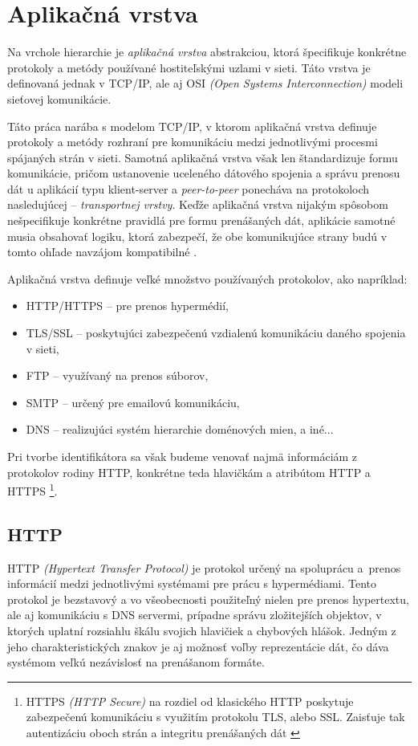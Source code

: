 \documentclass[
  printed, %
  table,   %
  lof,     %
  nolot,   %
  nocover
]{fithesis3}
\begin{document}
\section{Aplikačná vrstva}
Na vrchole hierarchie je \textit{aplikačná vrstva} abstrakciou, ktorá špecifikuje
konkrétne protokoly a metódy používané hostiteľskými uzlami v sieti. Táto
vrstva je definovaná jednak v TCP/IP, ale aj OSI
\textit{(Open Systems Interconnection)} modeli sieťovej komunikácie.

Táto práca narába s modelom TCP/IP, v ktorom aplikačná vrstva definuje
protokoly a metódy rozhraní pre komunikáciu medzi jednotlivými procesmi
spájaných strán v sieti. Samotná aplikačná vrstva však len štandardizuje formu
komunikácie, pričom ustanovenie uceleného dátového spojenia a správu prenosu dát
u aplikácií typu klient-server a \textit{peer-to-peer} ponecháva na protokoloch
nasledujúcej -- \textit{transportnej vrstvy}. Keďže aplikačná vrstva nijakým spôsobom
nešpecifikuje konkrétne pravidlá pre formu prenášaných dát,
aplikácie samotné musia obsahovať logiku, ktorá zabezpečí, že obe komunikujúce
strany budú v tomto ohľade navzájom kompatibilné \cite{rfc1123}.

Aplikačná vrstva definuje veľké množstvo používaných protokolov, ako napríklad:
\begin{itemize}
	\item HTTP/HTTPS -- pre prenos hypermédií, 
	\item TLS/SSL -- poskytujúci zabezpečenú vzdialenú komunikáciu daného spojenia v sieti,
	\item FTP -- využívaný na prenos súborov,
	\item SMTP -- určený pre emailovú komunikáciu,
	\item DNS -- realizujúci systém hierarchie doménových mien, a iné...
\end{itemize}
Pri tvorbe identifikátora sa však budeme venovať najmä informáciám z protokolov
rodiny HTTP, konkrétne teda hlavičkám a atribútom HTTP a HTTPS \footnote{HTTPS 
\textit{(HTTP Secure)} na rozdiel od klasického HTTP poskytuje zabezpečenú komunikáciu
s využitím protokolu TLS, alebo SSL. Zaisťuje tak autentizáciu oboch strán a integritu prenášaných dát \cite{rfc2818}}.

\subsection{HTTP}
HTTP \textit{(Hypertext Transfer Protocol)} je protokol určený
na spoluprácu a~prenos informácií medzi jednotlivými systémami pre
prácu s hypermédiami. Tento protokol je bezstavový a vo všeobecnosti
použiteľný nielen pre prenos hypertextu, ale aj komunikáciu s DNS servermi, prípadne
správu zložitejších objektov, v ktorých uplatní rozsiahlu škálu svojich
hlavičiek a chybových hlášok. Jedným z jeho charakteristických znakov je aj
možnosť voľby reprezentácie dát, čo dáva systémom veľkú nezávislosť na
prenášanom formáte.
\end{document}
